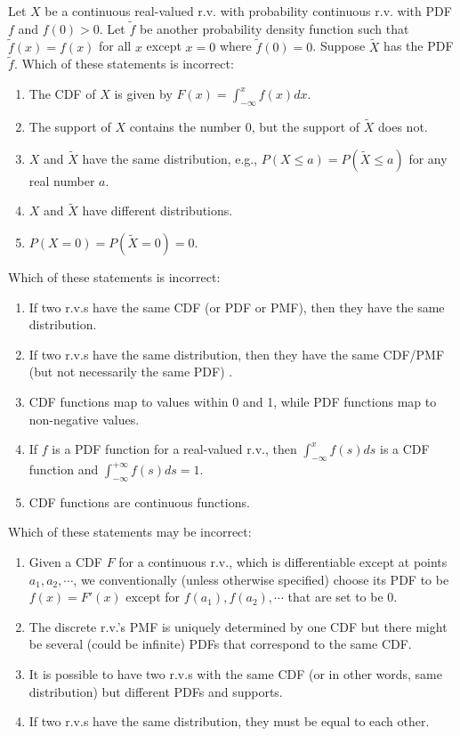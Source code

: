 \documentclass[poll_tutorial_format]{subfiles}
\begin{document}
	
		\begin{exercise}
		Let $X$ be a continuous real-valued r.v. with probability continuous r.v. with PDF $f$ and $f(0)> 0$. Let $\tilde{f}$ be another probability density function such that  $\tilde{f}(x)=f(x)$ for all $x$ except $x=0$ where $\tilde{f}(0)=0$.   Suppose $\tilde{X}$ has the PDF $\tilde{f}$.	
		Which of these statements is incorrect: 
		\begin{enumerate}
			\item The CDF of $X$ is given by $F(x)=\int_{-\infty}^{x}f(x)dx$.
			\item The support of $X$ contains the number $0$, but the support of $\tilde{X}$ does not.
			\item $X$ and $\tilde{X}$ have the same distribution, e.g., $P(X \leq a )=P(\tilde{X} \leq a)$ for any real number $a$.
 			\item $X$ and $\tilde{X}$ have different distributions.
 			\item $P(X=0)=P(\tilde{X}=0)=0$.
		\end{enumerate}
	\end{exercise}
	
	
	\begin{exercise}
		Which of these statements is incorrect: 
		\begin{enumerate}
			\item If two r.v.s have the same CDF (or PDF or PMF), then they have the same distribution.
			\item If two r.v.s have the same distribution, then they have the same CDF/PMF (but not necessarily the same PDF) .
			\item CDF functions map to values within 0 and 1, while PDF functions map to non-negative values. 
			\item If $f$ is a PDF function for a real-valued r.v.,  then $\int_{-\infty}^{x}f(s)ds$ is a CDF function and  $\int_{-\infty}^{+\infty}f(s)ds=1$.
			\item CDF functions are continuous functions. 
		\end{enumerate}
	\end{exercise}

\begin{exercise}
	Which of these statements may be incorrect: 
	\begin{enumerate}
		\item Given a CDF $F$ for a continuous r.v., which is differentiable except at points $a_1, a_2, \cdots$, we conventionally (unless otherwise specified) choose its PDF to be $f(x)=F'(x)$ except for  $f(a_1), f(a_2), \cdots$ that are set to be 0.
		\item The discrete r.v.'s PMF is uniquely determined by one CDF but there might be several (could be infinite) PDFs that correspond to the same CDF.   
		\item It is possible to have two r.v.s with the same CDF (or in other words, same distribution) but different PDFs and supports. 
		\item If two r.v.s have the same distribution, they must be equal to each other.
	\end{enumerate}
\end{exercise}
	
\end{document}
